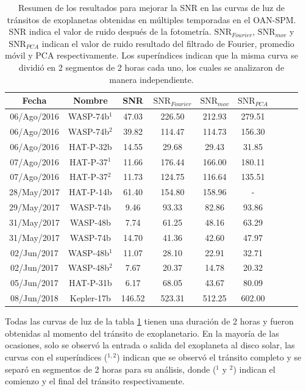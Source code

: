 \begin{table}[h!]
	\centering
	\begin{tabular}{ccccccccc}
	\hline 
	Fecha & Nombre & SNR & $\mbox{SNR}_{Fourier}$ &  $\mbox{SNR}_{mov}$ & $\mbox{SNR}_{PCA}$\\ 
	\hline
	06/Ago/2016 & WASP-74b$^{1}$ & 47.03 & 226.50 & 212.93 & 279.51 \\ 
	06/Ago/2016 & WASP-74b$^{2}$ & 39.82 & 114.47 & 114.73 & 156.30 \\
	06/Ago/2016 & HAT-P-32b & 14.55 & 29.68 & 29.43 & 31.85 \\
	07/Ago/2016 & HAT-P-37$^{1}$ & 11.66 & 176.44 & 166.00 & 180.11 \\ 
	07/Ago/2016 & HAT-P-37$^{2}$ & 11.73 & 124.75 & 116.64 & 135.51 \\ 
	28/May/2017 & HAT-P-14b & 61.40 & 154.80 & 158.96 & - \\ 
	29/May/2017 & WASP-74b & 9.46 & 93.33 & 82.86 & 93.86 \\
	31/May/2017 & WASP-48b & 7.74 & 61.25 & 48.16 & 63.29 \\  
	31/May/2017 & WASP-74b & 14.70 & 41.36 & 42.60 & 47.97 \\
	02/Jun/2017 & WASP-48b$^{1}$ & 11.07 & 28.10 & 22.91 & 32.71 \\
	02/Jun/2017 & WASP-48b$^{2}$ & 7.67 & 20.37 & 14.78 & 20.32 \\
	05/Jun/2017 & HAT-P-31b & 6.17 & 68.05 & 43.67 & 80.09 \\
	08/Jun/2018 & Kepler-17b & 146.52 & 523.31 & 512.25 & 602.00 \\ 
	\hline 
	\end{tabular} 
	\caption{Resumen de los resultados para mejorar la SNR en las curvas de luz de tránsitos de exoplanetas obtenidas en múltiples temporadas en el OAN-SPM. SNR indica el valor de ruido después de la fotometría. $\mbox{SNR}_{Fourier}$, $\mbox{SNR}_{mov}$ y $\mbox{SNR}_{PCA}$ indican el valor de ruido resultado del filtrado de Fourier, promedio móvil y PCA respectivamente. Los superíndices indican que la misma curva se dividió en 2 segmentos de 2 horas cada uno, los cuales se analizaron de manera independiente.}
	\label{tab_resultados_obs}
	\end{table}

Todas las curvas de luz de la tabla \ref{tab_resultados_obs} tienen una duración de 2 horas y fueron obtenidas al momento del tránsito de exoplanetario. En la mayoría de las ocasiones, solo se observó la entrada o salida del exoplaneta al disco solar, las curvas con el superíndices ($^{1,2}$) indican que se observó el tránsito completo y se separó en segmentos de 2 horas para su análisis, donde ($^{1}$ y $^{2}$) indican el comienzo y el final del tránsito respectivamente.

